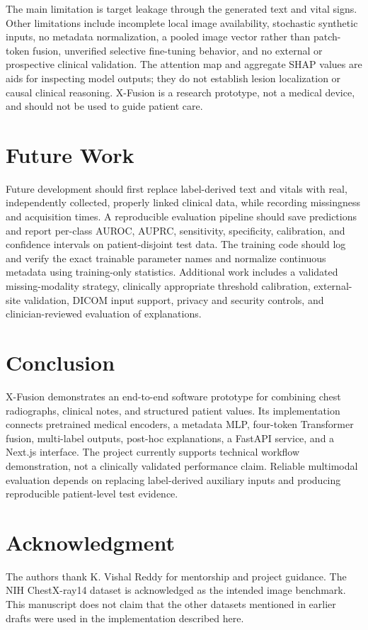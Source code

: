 \documentclass[conference]{IEEEtran}
\begin{document}
The main limitation is target leakage through the generated text and vital signs. Other limitations include incomplete local image availability, stochastic synthetic inputs, no metadata normalization, a pooled image vector rather than patch-token fusion, unverified selective fine-tuning behavior, and no external or prospective clinical validation. The attention map and aggregate SHAP values are aids for inspecting model outputs; they do not establish lesion localization or causal clinical reasoning. X-Fusion is a research prototype, not a medical device, and should not be used to guide patient care.

\section{Future Work}
Future development should first replace label-derived text and vitals with real, independently collected, properly linked clinical data, while recording missingness and acquisition times. A reproducible evaluation pipeline should save predictions and report per-class AUROC, AUPRC, sensitivity, specificity, calibration, and confidence intervals on patient-disjoint test data. The training code should log and verify the exact trainable parameter names and normalize continuous metadata using training-only statistics. Additional work includes a validated missing-modality strategy, clinically appropriate threshold calibration, external-site validation, DICOM input support, privacy and security controls, and clinician-reviewed evaluation of explanations.

\section{Conclusion}
X-Fusion demonstrates an end-to-end software prototype for combining chest radiographs, clinical notes, and structured patient values. Its implementation connects pretrained medical encoders, a metadata MLP, four-token Transformer fusion, multi-label outputs, post-hoc explanations, a FastAPI service, and a Next.js interface. The project currently supports technical workflow demonstration, not a clinically validated performance claim. Reliable multimodal evaluation depends on replacing label-derived auxiliary inputs and producing reproducible patient-level test evidence.

\section*{Acknowledgment}
The authors thank K. Vishal Reddy for mentorship and project guidance. The NIH ChestX-ray14 dataset is acknowledged as the intended image benchmark. This manuscript does not claim that the other datasets mentioned in earlier drafts were used in the implementation described here.
\end{document}
